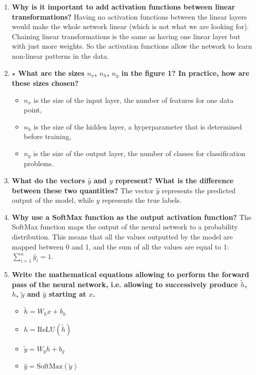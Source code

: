 \documentclass[12pt,a4paper]{article}
\begin{document}
\begin{enumerate}[resume]
    \item \textbf{Why is it important to add activation functions between linear transformations?} \newline
    Having no activation functions between the linear layers would make the whole network linear 
    (which is not what we are looking for). Chaining linear transformations is the same as having one linear
    layer but with just more weights. So the activation functions allow the network to learn non-linear
    patterns in the data.

    \item \textbf{$\star$ What are the sizes $n_x$, $n_h$, $n_y$ in the figure 1? In practice, how are these sizes chosen?}
    \begin{itemize}
        \item $n_x$ is the size of the input layer, the number of features for one data point,
        \item $n_h$ is the size of the hidden layer, a hyperparameter that is determined before training,
        \item $n_y$ is the size of the output layer, the number of classes for classification problems.
    \end{itemize}

    \item \textbf{What do the vectors $\hat{y}$ and $y$ represent? What is the difference between these two quantities?} \newline
    The vector $\hat{y}$ represents the predicted output of the model, while $y$ represents the true labels.

    \item \textbf{Why use a SoftMax function as the output activation function?} \newline
    The SoftMax function maps the output of the neural network to a probability distribution.
    This means that all the values outputted by the model are mapped between 0 and 1, and the sum
    of all the values are equal to 1: $\sum_{i=1}^{n} \hat{y}_i = 1$.

    \item \textbf{Write the mathematical equations allowing to perform the forward pass of the neural network, i.e.
allowing to successively produce $\tilde{h}$, $h$, $\tilde{y}$ and $\hat{y}$ starting at $x$.} 
    \begin{itemize}
        \item $\tilde{h} = W_h x + b_h$
        \item $h = \text{ReLU}(\tilde{h})$
        \item $\tilde{y} = W_y h + b_y$
        \item $\hat{y} = \text{SoftMax}(\tilde{y})$
    \end{itemize}
\end{enumerate}
\end{document}
